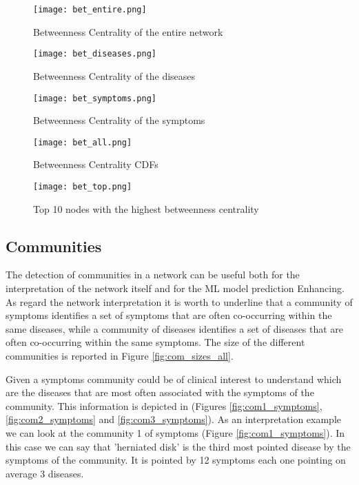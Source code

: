 \begin{figure}[H]
    \centering
    \texttt{[image: bet\_entire.png]}
    \caption{Betweenness Centrality of the entire network}
    \label{fig:bet_entire}
\end{figure}

\begin{figure}[H]
    \centering
    \texttt{[image: bet\_diseases.png]}
    \caption{Betweenness Centrality of the diseases}
    \label{fig:bet_diseases}
\end{figure}

\begin{figure}[H]
    \centering
    \texttt{[image: bet\_symptoms.png]}
    \caption{Betweenness Centrality of the symptoms}
    \label{fig:bet_symptoms}
\end{figure}

\begin{figure}[H]
   \centering
   \texttt{[image: bet\_all.png]}
   \caption{Betweenness Centrality CDFs}
   \label{fig:bet_all}
\end{figure}

\begin{figure}[H]
    \centering
    \texttt{[image: bet\_top.png]}
    \caption{Top 10 nodes with the highest betweenness centrality}
    \label{fig:bet_top}
\end{figure}


\subsection{Communities}
The detection of communities in a network can be useful both for the interpretation of the network itself and for the ML model prediction Enhancing.
As regard the network interpretation it is worth to underline that a community of symptoms identifies a set of symptoms that are 
often co-occurring within the same diseases, while a community of diseases identifies a set of diseases that are often co-occurring within the same symptoms.
The size of the different communities is reported in Figure \ref{fig:com_sizes_all}.

Given a symptoms community could be of clinical interest to understand which are the diseases that are most often associated with the symptoms of the community.
This information is depicted in (Figures \ref{fig:com1_symptoms}, \ref{fig:com2_symptoms} and \ref{fig:com3_symptoms}). 
As an interpretation example we can look at the community 1 of symptoms (Figure \ref{fig:com1_symptoms}). In this case we can say that 'herniated disk' is the 
third most pointed disease by the symptoms of the community. It is pointed by 12 symptoms each one pointing on average 3 diseases.


